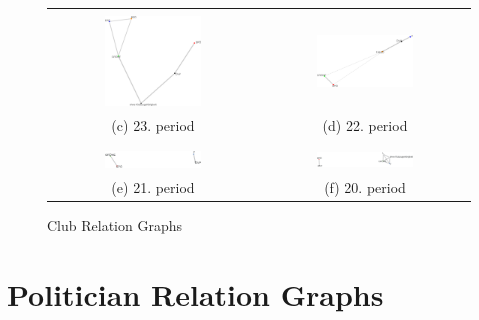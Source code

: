 \begin{figure}[h]
\begin{tabular}{ c | c }
		\\
		\\
		\hline
		\\
		\includegraphics[width=0.48\textwidth]{imgs/graphs/club-graphs/horizontal/graph_23.eps}
		&
		\includegraphics[width=0.48\textwidth]{imgs/graphs/club-graphs/horizontal/graph_22.eps}
		\\
		(c) 23. period
		&
		(d) 22. period
		\\
		\\
		\hline
		\\
		\includegraphics[width=0.48\textwidth]{imgs/graphs/club-graphs/horizontal/graph_21.eps}
		&
		\includegraphics[width=0.48\textwidth]{imgs/graphs/club-graphs/horizontal/graph_20.eps}
		\\
		(e) 21. period
		&
		(f) 20. period	
		
	\end{tabular}

	\caption{Club Relation Graphs}
	\label{fig:all_club_graphs}
\end{figure}

\section{Politician Relation Graphs}

